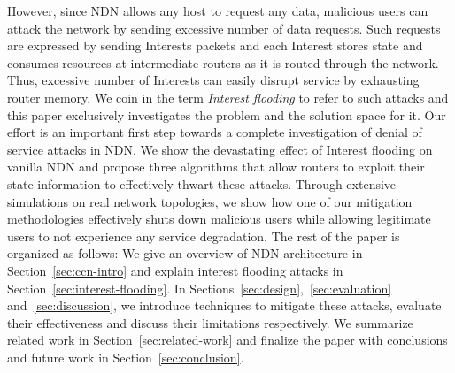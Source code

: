 However, since NDN allows any host to request any data, malicious users can attack the network by sending excessive number of data requests. Such requests are expressed by sending Interests packets and each Interest stores state and consumes resources at intermediate routers as it is routed through the network. Thus, excessive number of Interests can easily disrupt service by exhausting router memory. We coin in the term {\it Interest flooding} to refer to such attacks and
this paper exclusively investigates the problem and the solution space for it. Our effort is an important first step towards a complete investigation of denial of service attacks in NDN. We show the devastating effect of Interest flooding on vanilla NDN and propose three algorithms that allow routers to exploit their state information to effectively thwart these attacks. Through extensive simulations on real network topologies,  we show how one of our mitigation methodologies effectively shuts down malicious users while allowing legitimate users to not experience any service degradation. 
The rest of the paper is organized as follows: We give an overview of NDN architecture in Section~\ref{sec:ccn-intro} and explain interest flooding attacks in Section~\ref{sec:interest-flooding}. In Sections~\ref{sec:design},~\ref{sec:evaluation} and~\ref{sec:discussion}, we introduce techniques to mitigate these attacks, evaluate their effectiveness and discuss their limitations respectively. We summarize related work in Section~\ref{sec:related-work} and finalize the paper with conclusions and future work in Section~\ref{sec:conclusion}.




